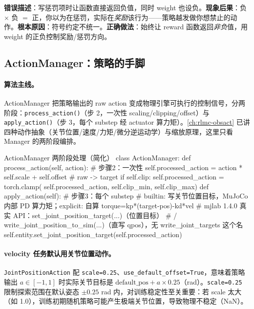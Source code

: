 \begin{pitfall}
\textbf{错误描述}：写惩罚项时让函数直接返回负值，同时 weight 也设负。\textbf{现象后果}：负 $\times$ 负 $=$ 正，你以为在惩罚，实际在\emph{奖励}该行为——策略越发做你想禁止的动作。\textbf{根本原因}：符号约定不统一。\textbf{正确做法}：始终让 reward 函数返回\emph{非负}值，用 weight 的正负控制奖励/惩罚方向。
\end{pitfall}

\subsection{ActionManager：策略的手脚}
\label{sec:rlmc-mgr-action}

\paragraph{算法主线。}ActionManager 把策略输出的 raw action 变成物理引擎可执行的控制信号，分两阶段：\verb|process_action()|（步 2，一次性 scaling/clipping/offset）与 \verb|apply_action()|（步 3，每个 substep 经 actuator 算力矩）。\cref{ch:rlmc-obsact} 已讲四种动作抽象（关节位置/速度/力矩/微分逆运动学）与缩放原理，这里只看 Manager 的两阶段编排。

\begin{codebox}[Python]{ActionManager 两阶段处理（简化）}
class ActionManager:
    def process_action(self, action):                 # 步骤2：一次性
        self.processed_action = action * self.scale + self.offset   # raw -> target
        if self.clip:
            self.processed_action = torch.clamp(
                self.processed_action, self.clip_min, self.clip_max)
    def apply_action(self):                           # 步骤3：每个 substep
        # builtin: 写关节位置目标，MuJoCo 内部 PD 算力矩；explicit: 自算 torque=kp*(target-pos)-kd*vel
        # mjlab 1.4.0 真实 API：set_joint_position_target(...)（位置目标）
        #   / write_joint_position_to_sim(...)（直写 qpos），无 write_joint_targets 这个名
        self.entity.set_joint_position_target(self.processed_action)
\end{codebox}

\paragraph{velocity 任务默认用关节位置动作。}\verb|JointPositionAction| 配 \verb|scale=0.25|、\verb|use_default_offset=True|，意味着策略输出 $a\in[-1,1]$ 时实际关节目标是 $\text{default\_pos}+a\times0.25$（rad）。\verb|scale=0.25| 限制探索范围在默认姿态 $\pm 0.25$ rad 内，对训练稳定性至关重要：若 scale 太大（如 1.0），训练初期随机策略可能产生极端关节位置，导致物理不稳定（NaN）。


